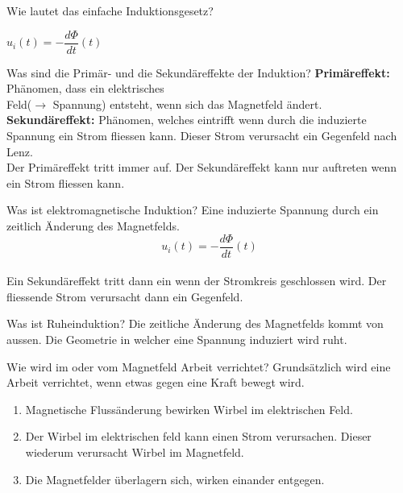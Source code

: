   
\begin{karte}{Wie lautet das einfache Induktionsgesetz?}
	\begin{center}
		\huge
		$u_{i}(t)=-\dfrac{d \Phi}{d t}(t)$
	\end{center}
\end{karte}

\begin{karte}{Was sind die Primär- und die Sekundäreffekte der Induktion?}
	\flushleft
	\textbf{Primäreffekt:} Phänomen, dass ein elektrisches \\Feld($\rightarrow$ Spannung) entsteht, wenn sich das Magnetfeld ändert.\\
	\textbf{Sekundäreffekt:} Phänomen, welches eintrifft wenn durch die induzierte Spannung ein Strom fliessen kann. Dieser Strom verursacht ein Gegenfeld nach Lenz.\\[10pt]
	Der Primäreffekt tritt immer auf. Der Sekundäreffekt kann nur auftreten wenn ein Strom fliessen kann.
\end{karte}

\begin{karte}{Was ist elektromagnetische Induktion?}
	Eine induzierte Spannung durch ein zeitlich Änderung des Magnetfelds.\\
	\begin{equation*}
		u_{i}(t)=-\dfrac{d \Phi}{d t}(t)
	\end{equation*}
	\\[10pt]
	Ein Sekundäreffekt tritt dann ein wenn der Stromkreis geschlossen wird. Der fliessende Strom verursacht dann ein Gegenfeld. 
\end{karte}

\begin{karte}{Was ist Ruheinduktion?}
	Die zeitliche Änderung des Magnetfelds kommt von aussen. Die Geometrie in welcher eine Spannung induziert wird ruht.
\end{karte}

\begin{karte}{Wie wird im oder vom Magnetfeld Arbeit verrichtet?}
	Grundsätzlich wird eine Arbeit verrichtet, wenn etwas gegen eine Kraft bewegt wird.
	\begin{enumerate}
		\item Magnetische Flussänderung bewirken Wirbel im elektrischen Feld.
		\item Der Wirbel im elektrischen feld kann einen Strom verursachen. Dieser wiederum verursacht Wirbel im Magnetfeld.
		\item Die Magnetfelder überlagern sich, wirken einander entgegen.
	\end{enumerate}
\end{karte}

